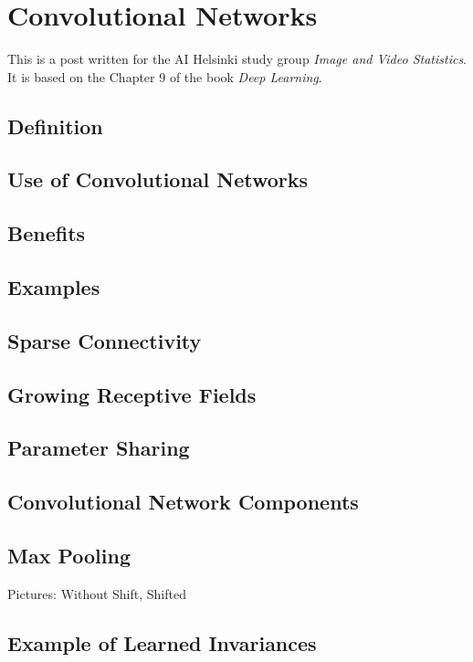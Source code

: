 \documentclass[]{article}
\begin{document}
\section{Convolutional Networks}
This is a post written for the AI Helsinki study group \emph{Image and Video Statistics}.
It is based on the Chapter 9 of the book \emph{Deep Learning}.


\subsection{Definition}

\subsection{Use of Convolutional Networks}

\subsection{Benefits}

\subsection{Examples}

\subsection{Sparse Connectivity}

\subsection{Growing Receptive Fields}

\subsection{Parameter Sharing}

\subsection{Convolutional Network Components}

\subsection{Max Pooling}
Pictures: Without Shift, Shifted

\subsection{Example of Learned Invariances}
\end{document}
